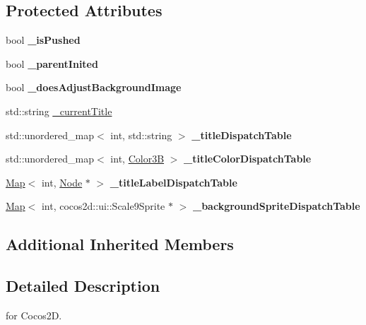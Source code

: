 \subsection*{Protected Attributes}
\begin{DoxyCompactItemize}
\item 
\mbox{\label{classControlButton_a09ea1249eaec7f5b569775d23e9c22b7}} 
bool {\bfseries \+\_\+is\+Pushed}
\item 
\mbox{\label{classControlButton_a930955484f1a16665d45859e66410f36}} 
bool {\bfseries \+\_\+parent\+Inited}
\item 
\mbox{\label{classControlButton_a71577bed02dc7beb1bb549bc6663d308}} 
bool {\bfseries \+\_\+does\+Adjust\+Background\+Image}
\item 
std\+::string \hyperlink{classControlButton_ad2ae4a37fd0e92ff7b28dd13051ca321}{\+\_\+current\+Title}
\item 
\mbox{\label{classControlButton_af9854367146fc5c596a9c6deb34b7387}} 
std\+::unordered\+\_\+map$<$ int, std\+::string $>$ {\bfseries \+\_\+title\+Dispatch\+Table}
\item 
\mbox{\label{classControlButton_ada99b991ceb7ae790517df076a7cd605}} 
std\+::unordered\+\_\+map$<$ int, \hyperlink{structColor3B}{Color3B} $>$ {\bfseries \+\_\+title\+Color\+Dispatch\+Table}
\item 
\mbox{\label{classControlButton_ad77f93b1a3e0e8b7de0fdce96d7a2ad3}} 
\hyperlink{classMap}{Map}$<$ int, \hyperlink{classNode}{Node} $\ast$ $>$ {\bfseries \+\_\+title\+Label\+Dispatch\+Table}
\item 
\mbox{\label{classControlButton_a4c2750eb1c79a6a77deb858e85a81872}} 
\hyperlink{classMap}{Map}$<$ int, cocos2d\+::ui\+::\+Scale9\+Sprite $\ast$ $>$ {\bfseries \+\_\+background\+Sprite\+Dispatch\+Table}
\end{DoxyCompactItemize}
\subsection*{Additional Inherited Members}


\subsection{Detailed Description}
for Cocos2D. 

